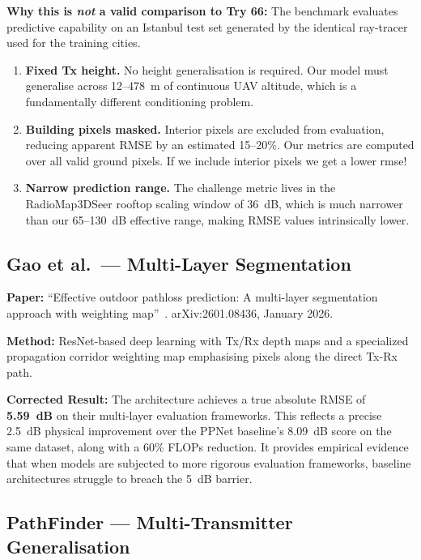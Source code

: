 \documentclass[11pt,a4paper]{article}
\begin{document}
\textbf{Why this is \emph{not} a valid comparison to Try 66:} The benchmark evaluates predictive capability on an Istanbul test set generated by the identical ray-tracer used for the training cities. 
\begin{enumerate}[nosep]

    \item \textbf{Fixed Tx height.} No height generalisation is required.
          Our model must generalise across 12--478~m of continuous UAV altitude,
          which is a fundamentally different conditioning problem.

    \item \textbf{Building pixels masked.} Interior pixels are excluded from
          evaluation, reducing apparent RMSE by an estimated 15--20\%. Our metrics
          are computed over all valid ground pixels. If we include interior pixels we get a lower rmse!

    \item \textbf{Narrow prediction range.} The challenge metric lives in the
          RadioMap3DSeer rooftop scaling window of 36~dB, which is much narrower
          than our 65--130~dB effective range, making RMSE values intrinsically lower.
\end{enumerate}

\subsection{Gao et al.\ --- Multi-Layer Segmentation}

\textbf{Paper:} ``Effective outdoor pathloss prediction: A multi-layer segmentation
approach with weighting map''~\cite{gao2026}. arXiv:2601.08436, January 2026.

\textbf{Method:} ResNet-based deep learning with Tx/Rx depth maps and a specialized propagation corridor weighting map emphasising pixels along the direct Tx-Rx path.

\textbf{Corrected Result:} The architecture achieves a true absolute RMSE of \textbf{5.59~dB} on their multi-layer evaluation frameworks. This reflects a precise 2.5~dB physical improvement over the PPNet baseline's 8.09~dB score on the same dataset, along with a 60\% FLOPs reduction. It provides empirical evidence that when models are subjected to more rigorous evaluation frameworks, baseline architectures struggle to breach the 5~dB barrier.

\subsection{PathFinder --- Multi-Transmitter Generalisation}
\end{document}
